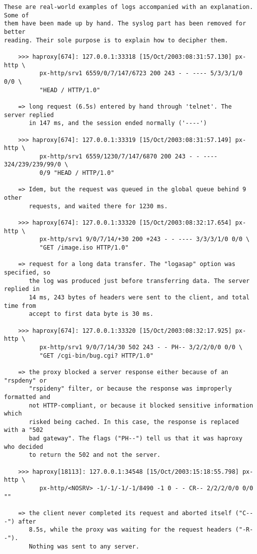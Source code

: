 \begin{verbatim}
These are real-world examples of logs accompanied with an explanation. Some of
them have been made up by hand. The syslog part has been removed for better
reading. Their sole purpose is to explain how to decipher them.

    >>> haproxy[674]: 127.0.0.1:33318 [15/Oct/2003:08:31:57.130] px-http \
          px-http/srv1 6559/0/7/147/6723 200 243 - - ---- 5/3/3/1/0 0/0 \
          "HEAD / HTTP/1.0"

    => long request (6.5s) entered by hand through 'telnet'. The server replied
       in 147 ms, and the session ended normally ('----')

    >>> haproxy[674]: 127.0.0.1:33319 [15/Oct/2003:08:31:57.149] px-http \
          px-http/srv1 6559/1230/7/147/6870 200 243 - - ---- 324/239/239/99/0 \
          0/9 "HEAD / HTTP/1.0"

    => Idem, but the request was queued in the global queue behind 9 other
       requests, and waited there for 1230 ms.

    >>> haproxy[674]: 127.0.0.1:33320 [15/Oct/2003:08:32:17.654] px-http \
          px-http/srv1 9/0/7/14/+30 200 +243 - - ---- 3/3/3/1/0 0/0 \
          "GET /image.iso HTTP/1.0"

    => request for a long data transfer. The "logasap" option was specified, so
       the log was produced just before transferring data. The server replied in
       14 ms, 243 bytes of headers were sent to the client, and total time from
       accept to first data byte is 30 ms.

    >>> haproxy[674]: 127.0.0.1:33320 [15/Oct/2003:08:32:17.925] px-http \
          px-http/srv1 9/0/7/14/30 502 243 - - PH-- 3/2/2/0/0 0/0 \
          "GET /cgi-bin/bug.cgi? HTTP/1.0"

    => the proxy blocked a server response either because of an "rspdeny" or
       "rspideny" filter, or because the response was improperly formatted and
       not HTTP-compliant, or because it blocked sensitive information which
       risked being cached. In this case, the response is replaced with a "502
       bad gateway". The flags ("PH--") tell us that it was haproxy who decided
       to return the 502 and not the server.

    >>> haproxy[18113]: 127.0.0.1:34548 [15/Oct/2003:15:18:55.798] px-http \
          px-http/<NOSRV> -1/-1/-1/-1/8490 -1 0 - - CR-- 2/2/2/0/0 0/0 ""

    => the client never completed its request and aborted itself ("C---") after
       8.5s, while the proxy was waiting for the request headers ("-R--").
       Nothing was sent to any server.


\end{verbatim}
